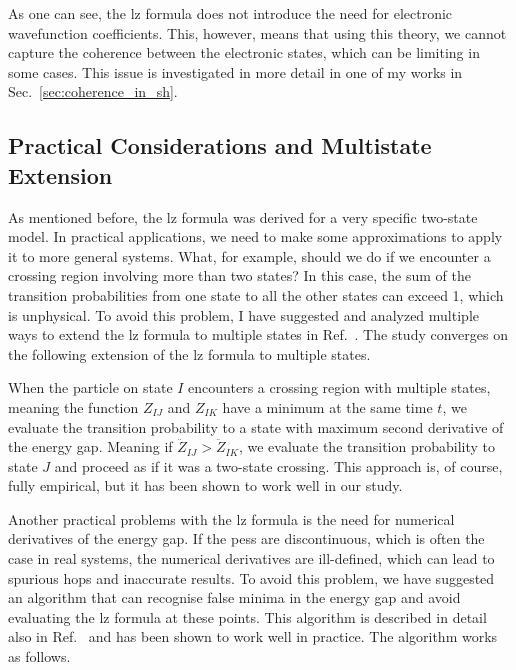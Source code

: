 As one can see, the \gls{lz} formula does not introduce the need for electronic wavefunction coefficients. This, however, means that using this theory, we cannot capture the coherence between the electronic states, which can be limiting in some cases. This issue is investigated in more detail in one of my works in Sec.~\ref{sec:coherence_in_sh}.
\subsection{Practical Considerations and Multistate Extension}\label{sec:landau_zener_practical_considerations}
As mentioned before, the \gls{lz} formula was derived for a very specific two-state model. In practical applications, we need to make some approximations to apply it to more general systems. What, for example, should we do if we encounter a crossing region involving more than two states? In this case, the sum of the transition probabilities from one state to all the other states can exceed 1, which is unphysical. To avoid this problem, I have suggested and analyzed multiple ways to extend the \gls{lz} formula to multiple states in Ref.~\cite{10.1021/acs.jctc.5c01176}. The study converges on the following extension of the \gls{lz} formula to multiple states.

When the particle on state $I$ encounters a crossing region with multiple states, meaning the function $Z_{IJ}$ and $Z_{IK}$ have a minimum at the same time $t$, we evaluate the transition probability to a state with maximum second derivative of the energy gap. Meaning if $\ddot Z_{IJ}>\ddot Z_{IK}$, we evaluate the transition probability to state $J$ and proceed as if it was a two-state crossing. This approach is, of course, fully empirical, but it has been shown to work well in our study.

Another practical problems with the \gls{lz} formula is the need for numerical derivatives of the energy gap. If the \glspl{pes} are discontinuous, which is often the case in real systems, the numerical derivatives are ill-defined, which can lead to spurious hops and inaccurate results. To avoid this problem, we have suggested an algorithm that can recognise false minima in the energy gap and avoid evaluating the \gls{lz} formula at these points. This algorithm is described in detail also in Ref.~\cite{10.1021/acs.jctc.5c01176} and has been shown to work well in practice. The algorithm works as follows.

